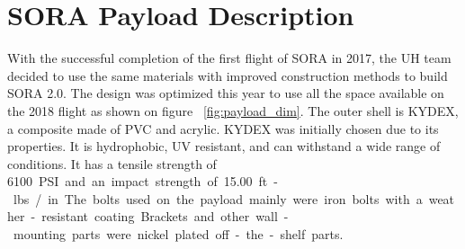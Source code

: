 \newpage
\section{SORA Payload Description}
\label{sec:Hardware}
With the successful completion of the first flight of SORA in 2017, the UH team decided to use the same materials with improved construction methods to build SORA 2.0.  The design was optimized this year to use all the space available on the 2018 flight as shown on figure ~\ref{fig:payload_dim}.   The outer shell is KYDEX, a composite made of PVC and acrylic. KYDEX	 was initially chosen due to its properties.  It is hydrophobic, UV resistant, and can withstand a wide range of conditions.  It has a tensile strength of \SI{6100} PSI and an impact strength of \SI{15.00} ft.-lbs./in.  The bolts used on the payload mainly were iron bolts with a weather-resistant coating.   Brackets and other wall-mounting parts were nickel plated off-the-shelf parts.  
%
